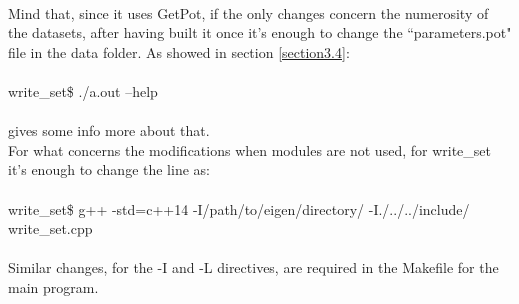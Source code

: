 \documentclass[12pt, a4paper]{report}
\theoremstyle{definition}
\begin{document}
{{\\}
Mind that, since it uses GetPot, if the only changes concern the numerosity of the datasets, after having built it once it's enough to change the ``parameters.pot" file in the data folder. As showed in section \ref{section3.4}: \\
{\\ \ttfamily 
	write\_set\$ ./a.out --help\\
\\}
gives some info more about that.\\
\newline\noindent For what concerns the modifications when modules are not used, for write\_set it's enough to change the line as:\\
{\\ \ttfamily 
	write\_set\$ g++ -std=c++14 -I/path/to/eigen/directory/ -I./../../include/ write\_set.cpp\\
\\}
Similar changes, for the {\ttfamily -I} and {\ttfamily -L} directives, are required in the Makefile for the main program.

}
\end{document}
